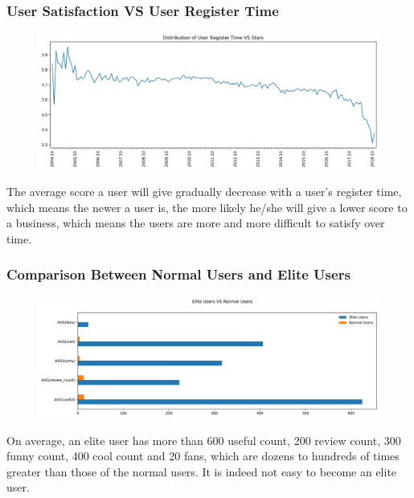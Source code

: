 \documentclass[12pt]{article}
\begin{document}
\subsubsection{User Satisfaction VS User Register Time}
\begin{figure}[H]
\begin{center}
    \includegraphics[width=1.0\textwidth]{../05_dataMining/distributionUserRegisterTimeStars.png}
\end{center}
\end{figure}
The average score a user will give gradually decrease with a user's register time, which means the newer a user is, the more likely he/she will give a lower score to a business, which means the users are more and more difficult to satisfy over time.

\subsubsection{Comparison Between Normal Users and Elite Users}
\begin{figure}[H]
\begin{center}
    \includegraphics[width=1.0\textwidth]{../05_dataMining/eliteVSNormalUsers.png}
\end{center}
\end{figure}
On average, an elite user has more than 600 useful count, 200 review count, 300 funny count, 400 cool count and 20 fans, which are dozens to hundreds of times greater than those of the normal users. It is indeed not easy to become an elite user.
\end{document}

